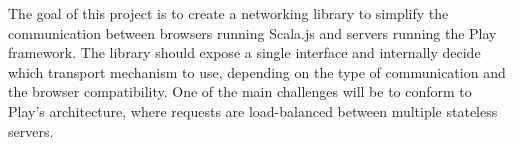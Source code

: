 The goal of this project is to create a networking library to simplify the communication between browsers running Scala.js and servers running the Play framework. The library should expose a single interface and internally decide which transport mechanism to use, depending on the type of communication and the browser compatibility. One of the main challenges will be to conform to Play's architecture, where requests are load-balanced between multiple stateless servers. 
